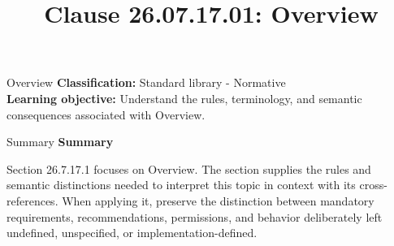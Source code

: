 \documentclass[10pt,letterpaper]{article}
\title{Clause 26.07.17.01: Overview}
\author{}
\date{}
\begin{document}
\maketitle
\begin{CornellOverviewBox}{Overview}
\textbf{Classification:} Standard library - Normative\\[2pt]
\textbf{Learning objective:} Understand the rules, terminology, and semantic consequences associated with Overview.
\end{CornellOverviewBox}\begin{CornellSummaryBox}{Summary}
{\sffamily\bfseries\color{Accent} Summary}\par\vspace{3pt}Section 26.7.17.1 focuses on Overview. The section supplies the rules and semantic distinctions needed to interpret this topic in context with its cross-references. When applying it, preserve the distinction between mandatory requirements, recommendations, permissions, and behavior deliberately left undefined, unspecified, or implementation-defined.
\end{CornellSummaryBox}
\end{document}
